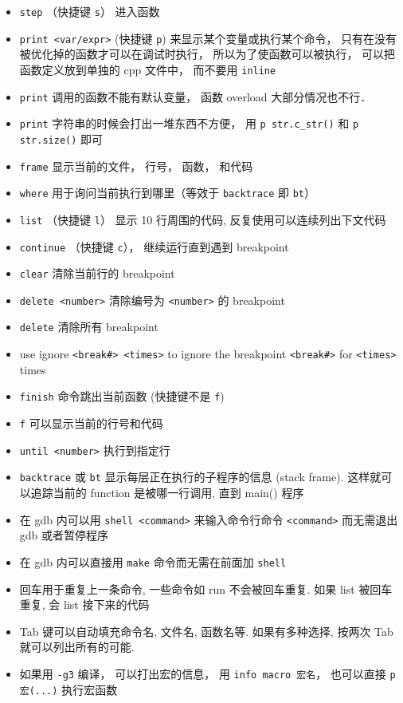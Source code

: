 \begin{itemize}
\item \verb`step` （快捷键 \verb`s`） 进入函数
\item \verb`print <var/expr>` (快捷键 \verb`p`) 来显示某个变量或执行某个命令， 只有在没有被优化掉的函数才可以在调试时执行， 所以为了使函数可以被执行， 可以把函数定义放到单独的 cpp 文件中， 而不要用 \verb`inline`
\item \verb`print` 调用的函数不能有默认变量， 函数 overload 大部分情况也不行．
\item \verb`print` 字符串的时候会打出一堆东西不方便， 用 \verb`p str.c_str()` 和 \verb`p str.size()` 即可
\item \verb`frame` 显示当前的文件， 行号， 函数， 和代码
\item \verb`where` 用于询问当前执行到哪里（等效于 \verb`backtrace` 即 \verb`bt`）
\item \verb`list` （快捷键 \verb`l`） 显示 10 行周围的代码, 反复使用可以连续列出下文代码
\item \verb`continue` （快捷键 \verb`c`）， 继续运行直到遇到 breakpoint
\item \verb`clear` 清除当前行的 breakpoint
\item \verb`delete <number>` 清除编号为 \verb`<number>` 的 breakpoint
\item \verb`delete` 清除所有 breakpoint
\item use ignore \verb`<break#> <times>` to ignore the breakpoint \verb`<break#>` for \verb`<times>` times
\item \verb`finish` 命令跳出当前函数 (快捷键不是 \verb`f`)
\item \verb`f` 可以显示当前的行号和代码
\item \verb`until <number>` 执行到指定行
\item \verb`backtrace` 或 \verb`bt` 显示每层正在执行的子程序的信息 (stack frame). 这样就可以追踪当前的 function 是被哪一行调用, 直到 main() 程序

\item 在 gdb 内可以用 \verb`shell <command>` 来输入命令行命令 \verb`<command>` 而无需退出 gdb 或者暂停程序
\item 在 gdb 内可以直接用 \verb`make` 命令而无需在前面加 \verb`shell`
\item 回车用于重复上一条命令, 一些命令如 run 不会被回车重复. 如果 list 被回车重复, 会 list 接下来的代码
\item Tab 键可以自动填充命令名, 文件名, 函数名等. 如果有多种选择, 按两次 Tab 就可以列出所有的可能.
\item 如果用 \verb|-g3| 编译， 可以打出宏的信息， 用 \verb|info macro 宏名|， 也可以直接 \verb|p 宏(...)| 执行宏函数
\end{itemize}

